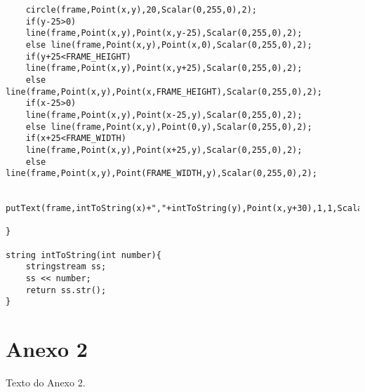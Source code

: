 \begin{lstlisting}
	circle(frame,Point(x,y),20,Scalar(0,255,0),2);
    if(y-25>0)
    line(frame,Point(x,y),Point(x,y-25),Scalar(0,255,0),2);
    else line(frame,Point(x,y),Point(x,0),Scalar(0,255,0),2);
    if(y+25<FRAME_HEIGHT)
    line(frame,Point(x,y),Point(x,y+25),Scalar(0,255,0),2);
    else line(frame,Point(x,y),Point(x,FRAME_HEIGHT),Scalar(0,255,0),2);
    if(x-25>0)
    line(frame,Point(x,y),Point(x-25,y),Scalar(0,255,0),2);
    else line(frame,Point(x,y),Point(0,y),Scalar(0,255,0),2);
    if(x+25<FRAME_WIDTH)
    line(frame,Point(x,y),Point(x+25,y),Scalar(0,255,0),2);
    else line(frame,Point(x,y),Point(FRAME_WIDTH,y),Scalar(0,255,0),2);

	putText(frame,intToString(x)+","+intToString(y),Point(x,y+30),1,1,Scalar(0,255,0),2);

}

string intToString(int number){
    stringstream ss;
	ss << number;
	return ss.str();
}
\end{lstlisting}

\chapter{Anexo 2}
\label{Anexo2}

Texto do Anexo 2.



